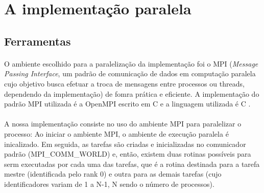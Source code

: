 \documentclass[a4paper,10pt]{article}
\begin{document}
\newpage

\section{A implementação paralela}
\subsection{Ferramentas}

\paragraph{}O ambiente escolhido para a paralelização da implementação foi o MPI (\emph{Message Passing Interface}, um padrão de comunicação de dados em computação paralela cujo objetivo busca efetuar a troca de mensagens entre processos ou threads, dependendo da implementação) de fomra prática e eficiente. A implementação do padrão MPI utilizada é a OpenMPI \citep{gabriel2004open} escrito em C e a linguagem utilizada é C .\\
\paragraph{} A nossa implementação consiste no uso do ambiente MPI para paralelizar o processo: Ao iniciar o ambiente MPI, o ambiente de execução paralela é inicalizado. Em seguida, as tarefas são criadas e inicializadas no comunicador padrão (MPI\_COMM\_WORLD) e, então, existem duas rotinas possíveis para serm executadas por cada uma das tarefas, que é a rotina destinada para a tarefa mestre (identificada pelo rank 0) e outra para as demais tarefas (cujo identificadores variam de 1 a N-1, N sendo o número de processos).\\
\end{document}
